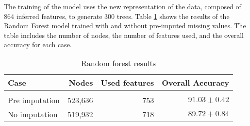 The training of the model uses the new representation of the data, composed of 864 inferred features, to generate 300 trees.
Table \ref{tab:rfresults} shows the results of the Random Forest model trained with and without pre-imputed missing values. 
The table includes the number of nodes, the number of features used, and the overall accuracy for each case.

\begin{table}[H]
  \centering
    \begin{tabular}{lrrr}
    Case                       & Nodes   & Used features & Overall Accuracy             \\[0.2cm] 
    \hline \\[-0.2cm]
    Pre imputation      & 523,636  & 753          & $91.03 \pm 0.42$\\
    No imputation       & 519,932  & 718          & $89.72 \pm 0.84$
    \end{tabular}
  \caption{Random forest results}
  \label{tab:rfresults}
\end{table}
